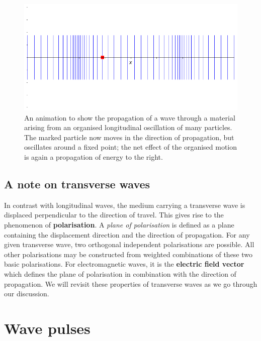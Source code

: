 \documentclass[
]{book}
\begin{document}
\begin{figure}

{\centering \includegraphics[width=0.7\linewidth]{visualisations/ch6-longitudinalwave1} 

}

\caption{An animation to show the propagation of a wave through a material arising from an organised longitudinal oscillation of many particles. The marked particle now  moves in the direction of propagation, but oscillates around a fixed point; the net effect of the organised motion is again a propagation of energy to the right.}\label{fig:ch6-longitudinalwaveill1}
\end{figure}

\hypertarget{a-note-on-transverse-waves}{%
\subsection*{A note on transverse waves}\label{a-note-on-transverse-waves}}

In contrast with longitudinal waves, the medium carrying a transverse wave is displaced perpendicular to the direction of travel. This gives rise to the phenomenon of \textbf{polarisation}. A \emph{plane of polarisation} is defined as a plane containing the displacement direction and the direction of propagation. For any given transverse wave, two orthogonal independent polarisations are possible. All other polarisations may be constructed from weighted combinations of these two basic polarisations. For electromagnetic waves, it is the \textbf{electric field vector} which defines the plane of polarisation in combination with the direction of propagation. We will revisit these properties of transverse waves as we go through our discussion.

\hypertarget{sec:ch6-wavepulses}{%
\section{Wave pulses}\label{sec:ch6-wavepulses}}
\end{document}
